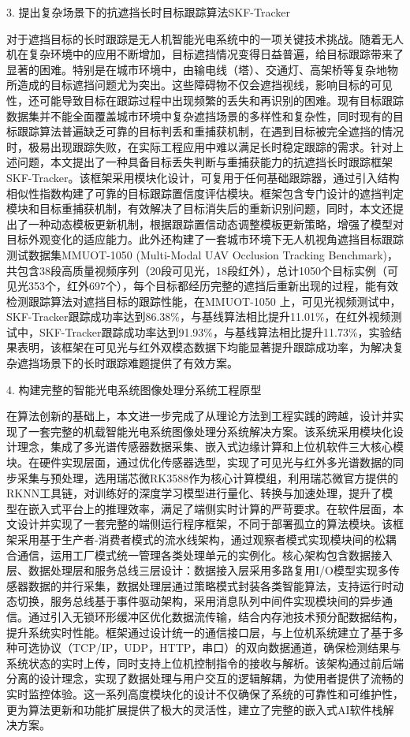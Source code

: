 3. 提出复杂场景下的抗遮挡长时目标跟踪算法SKF-Tracker

对于遮挡目标的长时跟踪是无人机智能光电系统中的一项关键技术挑战。随着无人机在复杂环境中的应用不断增加，目标遮挡情况变得日益普遍，给目标跟踪带来了显著的困难。特别是在城市环境中，由输电线（塔）、交通灯、高架桥等复杂地物所造成的目标遮挡问题尤为突出。这些障碍物不仅会遮挡视线，影响目标的可见性，还可能导致目标在跟踪过程中出现频繁的丢失和再识别的困难。现有目标跟踪数据集并不能全面覆盖城市环境中复杂遮挡场景的多样性和复杂性，同时现有的目标跟踪算法普遍缺乏可靠的目标判丢和重捕获机制，在遇到目标被完全遮挡的情况时，极易出现跟踪失败，在实际工程应用中难以满足长时稳定跟踪的需求。针对上述问题，本文提出了一种具备目标丢失判断与重捕获能力的抗遮挡长时跟踪框架SKF-Tracker。该框架采用模块化设计，可复用于任何基础跟踪器，通过引入结构相似性指数构建了可靠的目标跟踪置信度评估模块。框架包含专门设计的遮挡判定模块和目标重捕获机制，有效解决了目标消失后的重新识别问题，同时，本文还提出了一种动态模板更新机制，根据跟踪置信动态调整模板更新策略，增强了模型对目标外观变化的适应能力。此外还构建了一套城市环境下无人机视角遮挡目标跟踪测试数据集MMUOT-1050 (Multi-Modal UAV Occlusion Tracking Benchmark)，共包含38段高质量视频序列（20段可见光，18段红外），总计1050个目标实例（可见光353个，红外697个），每个目标都经历完整的遮挡后重新出现的过程，能有效检测跟踪算法对遮挡目标的跟踪性能，在MMUOT-1050 上，可见光视频测试中，SKF-Tracker跟踪成功率达到86.38\%，与基线算法相比提升11.01\%，在红外视频测试中，SKF-Tracker跟踪成功率达到91.93\%，与基线算法相比提升11.73\%，实验结果表明，该框架在可见光与红外双模态数据下均能显著提升跟踪成功率，为解决复杂遮挡场景下的长时跟踪难题提供了有效方案。

4. 构建完整的智能光电系统图像处理分系统工程原型

在算法创新的基础上，本文进一步完成了从理论方法到工程实践的跨越，设计并实现了一套完整的机载智能光电系统图像处理分系统解决方案。该系统采用模块化设计理念，集成了多光谱传感器数据采集、嵌入式边缘计算和上位机软件三大核心模块。在硬件实现层面，通过优化传感器选型，实现了可见光与红外多光谱数据的同步采集与预处理，选用瑞芯微RK3588作为核心计算模组，利用瑞芯微官方提供的RKNN工具链，对训练好的深度学习模型进行量化、转换与加速处理，提升了模型在嵌入式平台上的推理效率，满足了端侧实时计算的严苛要求。在软件层面，本文设计并实现了一套完整的端侧运行程序框架，不同于部署孤立的算法模块。该框架采用基于生产者-消费者模式的流水线架构，通过观察者模式实现模块间的松耦合通信，运用工厂模式统一管理各类处理单元的实例化。核心架构包含数据接入层、数据处理层和服务总线三层设计：数据接入层采用多路复用I/O模型实现多传感器数据的并行采集，数据处理层通过策略模式封装各类智能算法，支持运行时动态切换，服务总线基于事件驱动架构，采用消息队列中间件实现模块间的异步通信。通过引入无锁环形缓冲区优化数据流传输，结合内存池技术预分配数据结构，提升系统实时性能。框架通过设计统一的通信接口层，与上位机系统建立了基于多种可选协议（TCP/IP，UDP，HTTP，串口）的双向数据通道，确保检测结果与系统状态的实时上传，同时支持上位机控制指令的接收与解析。该架构通过前后端分离的设计理念，实现了数据处理与用户交互的逻辑解耦，为使用者提供了流畅的实时监控体验。这一系列高度模块化的设计不仅确保了系统的可靠性和可维护性，更为算法更新和功能扩展提供了极大的灵活性，建立了完整的嵌入式AI软件栈解决方案。

